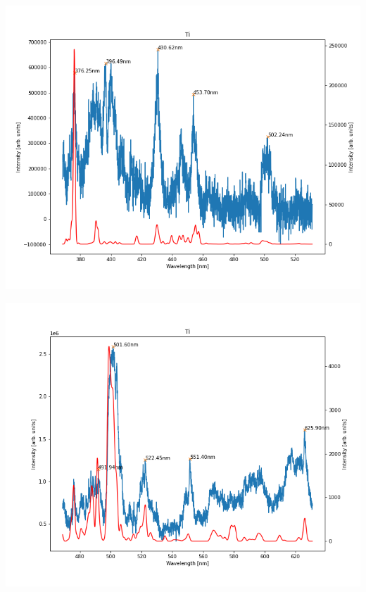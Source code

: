 \documentclass{beamer}
\begin{document}
\begin{frame}
    \includegraphics[scale=0.45]{Ti/450nm.png}
\end{frame}

\begin{frame}
    \includegraphics[scale=0.45]{Ti/550nm.png}
\end{frame}
\end{document}
